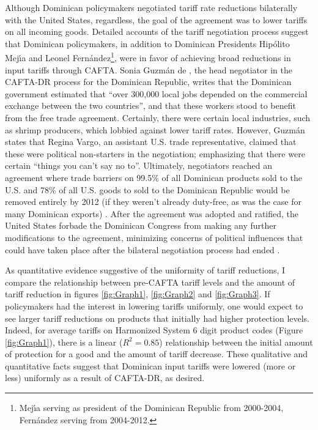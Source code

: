 \documentclass[12pt]{article}
\begin{document}
Although Dominican policymakers negotiated tariff rate reductions bilaterally with the
United States, regardless, the goal of the agreement was to lower tariffs on all
incoming goods. Detailed accounts of the tariff negotiation process suggest that Dominican policymakers,
in addition to Dominican Presidents Hip\'{o}lito Mej\'{\i}a and Leonel Fern\'{a}ndez\footnote{Mej\'{\i}a
serving as president of the Dominican Republic from 2000-2004, Fern\'{a}ndez serving from 2004-2012.},
were in favor of achieving broad reductions in input tariffs through CAFTA. Sonia Guzm\'{a}n de 
\citeauthor{guzman}, 
the head negotiator in the CAFTA-DR process for the Dominican Republic, writes that the Dominican 
government estimated that ``over 300,000 local jobs depended
on the commercial exchange between the two countries'', and that these workers stood to benefit from the 
free trade agreement. Certainly, there were certain local industries, such as shrimp producers,
which lobbied against lower tariff rates. However, Guzm\'{a}n states that Regina Vargo, an 
assistant U.S. trade representative, claimed that these were political non-starters in the negotiation;
emphasizing that there were certain ``things you can't say no to''. Ultimately,
negotiators reached an agreement where trade barriers on 99.5\% of all Dominican products sold to 
the U.S. and 78\% of all U.S. goods to sold to the Dominican Republic would be removed entirely by 2012
(if they weren't already duty-free, as was the case for many Dominican exports) \citep{guzman}. 
After the agreement was adopted and ratified, the United States
forbade the Dominican Congress from making any further modifications to the agreement, 
minimizing concerns of political influences that could have taken place after the bilateral
negotiation process had ended \citep{usambassador}.

As quantitative evidence suggestive of the uniformity of tariff reductions, 
I compare the relationship between pre-CAFTA tariff
levels and the amount of tariff reduction in figures \ref{fig:Graph1}, \ref{fig:Graph2} and 
\ref{fig:Graph3}. If policymakers had the interest
in lowering tariffs uniformly, one would expect to see larger tariff reductions on products that
initially had higher protection levels. Indeed, for average tariffs on Harmonized System 
6 digit product codes (Figure \ref{fig:Graph1}), there is a linear ($R^2=0.85$) relationship 
between the initial amount of protection for a good and
the amount of tariff decrease. These qualitative and quantitative facts
suggest that Dominican input tariffs
were lowered (more or less) uniformly as a result of CAFTA-DR, as desired.
\end{document}
